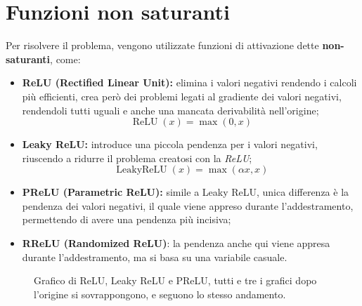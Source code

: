 \section{Funzioni non saturanti}
Per risolvere il problema, vengono utilizzate funzioni di attivazione dette \textbf{non-saturanti}, come:
\begin{itemize}
    \item \textbf{ReLU (Rectified Linear Unit):} elimina i valori negativi rendendo i calcoli più efficienti, crea però dei problemi legati al gradiente dei valori negativi, rendendoli tutti uguali e anche una mancata derivabilità nell'origine;
    \begin{equation}
        \operatorname{ReLU}(x) = \max(0, x)
    \end{equation}
    \item \textbf{Leaky ReLU:} introduce una piccola pendenza per i valori negativi, riuscendo a ridurre il problema creatosi con la \textit{ReLU};
    \begin{equation}
        \operatorname{LeakyReLU}(x) = \max(\alpha x, x)
    \end{equation}
    \item \textbf{PReLU (Parametric ReLU):} simile a Leaky ReLU, unica differenza è la pendenza dei valori negativi, il quale viene appreso durante l'addestramento, permettendo di avere una pendenza più incisiva;
    \item \textbf{RReLU (Randomized ReLU)}: la pendenza anche qui viene appresa durante l'addestramento, ma si basa su una variabile casuale.
\end{itemize}

\begin{figure}[h]
    \centering
    \caption{Grafico di ReLU, Leaky ReLU e PReLU, tutti e tre i grafici dopo l'origine si sovrappongono, e seguono lo stesso andamento.}
\end{figure}

